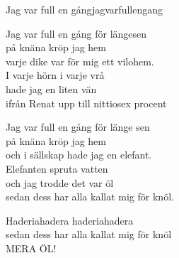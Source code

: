 \begin{song}{Jag var full en gång}{jagvarfullengang}
\begin{vers}
Jag var full en gång för längesen\\
på knäna kröp jag hem\\
varje dike var för mig ett vilohem.\\
I varje hörn i varje vrå\\
hade jag en liten vän\\
ifrån Renat upp till nittiosex procent\\
\end{vers}
\begin{vers}
Jag var full en gång för länge sen\\
på knäna kröp jag hem\\
och i sällskap hade jag en elefant.\\
Elefanten spruta vatten\\
och jag trodde det var öl\\
sedan dess har alla kallat mig för knöl.\\
\end{vers}
\begin{vers}
Haderiahadera haderiahadera\\
sedan dess har alla kallat mig för knöl\\
MERA ÖL!\\
\end{vers}
\end{song}
